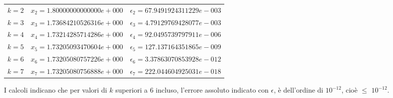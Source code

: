 \begin{enumerate}
\begin{center}
\begin{tabular}{|c|c|c|}
    			$k=2$ & $x_2 = 1.80000000000000e+000$ & $\epsilon_2 = 67.9491924311229e-003$\\
    			$k=3$ & $x_3 = 1.73684210526316e+000$ & $\epsilon_3 = 4.79129769428077e-003$\\
    			$k=4$ & $x_4 = 1.73214285714286e+000$ & $\epsilon_4 = 92.0495739797911e-006$\\
    			$k=5$ & $x_5 = 1.73205093470604e+000$ & $\epsilon_5 = 127.137164351865e-009$\\
    			$k=6$ & $x_6 = 1.73205080757226e+000$ & $\epsilon_6 = 3.37863070853928e-012$\\
    			$k=7$ & $x_7 = 1.73205080756888e+000$ & $\epsilon_7 = 222.044604925031e-018$\\
			\hline
			\end{tabular}
		\end{center}
		I calcoli indicano che per valori di $k$ superiori a 6 incluso, l'errore assoluto indicato con $\epsilon$, è dell'ordine di \(10^{-12}\), cioè $\leq$ \(10^{-12}\).\\
\end{enumerate}